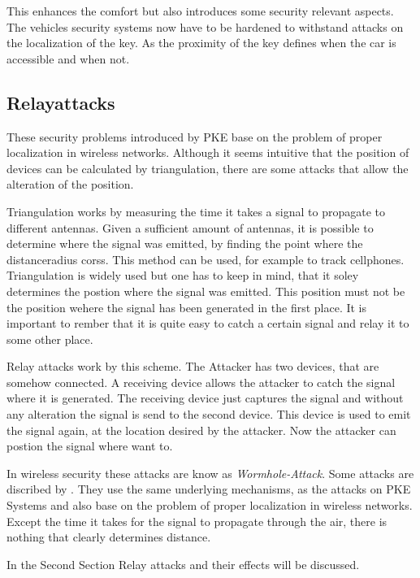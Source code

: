 	This enhances the comfort but also introduces some security relevant aspects.
	The vehicles security systems now have to be hardened
	to withstand attacks on the localization of the key.
	As the proximity of the key defines when the car is accessible and when not. 

\subsection*{Relayattacks}
	These security problems introduced by PKE base on the problem of proper
	localization in wireless networks.
	Although it seems intuitive that the position of devices can be calculated by
	triangulation, there are some attacks that allow the alteration of the position.


	Triangulation works by measuring the time it takes a signal to propagate
	to different antennas.
	Given a sufficient amount of antennas,
	it is possible to determine where the signal was emitted,
	by finding the point where the distanceradius corss. 				%
	This method can be used,
	for example to track cellphones.	%
	Triangulation is widely used but one has to keep in mind,
	that it soley determines the postion where the signal was emitted.
	This position must not be the position wehere the signal has been generated in the first place.
	It is important to rember that it is quite easy to catch
	a certain signal and relay it to some other place.

	Relay attacks work by this scheme.
	The Attacker has two devices,
	that are somehow connected.
	A receiving device allows the attacker to catch the signal where it is generated.
	The receiving device just captures the signal and
	without any alteration the signal is send to the second device.
	This device is used to emit the signal again,
	at the location desired by the attacker.
	Now the attacker can postion the signal where want to.

	In wireless security these attacks are know as \textsl{Wormhole-Attack}.
	Some attacks are discribed by \citeauthor{wormhole}.	%
	They use the same underlying mechanisms, as the attacks on PKE Systems
	and also base on the problem of proper localization in wireless networks.
	Except the time it takes for the signal to propagate through the air,
	there is nothing that clearly determines distance.

	In the Second Section Relay attacks and their effects will be discussed.
